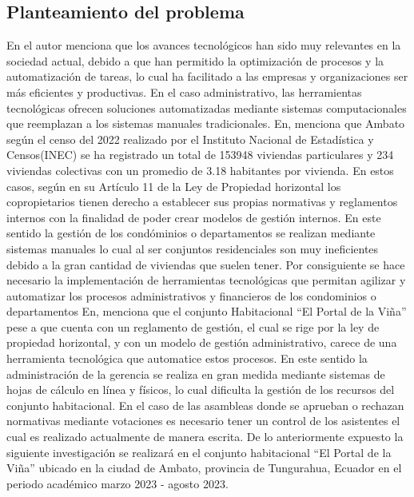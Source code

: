 \subsection{Planteamiento del problema}\label{subsec:planteamiento-del-problema}
En\cite{MoranSalazar} el autor menciona que los avances tecnológicos han sido muy relevantes en la sociedad actual, debido a que han permitido la optimización de procesos y la automatización de tareas, lo cual ha facilitado a las empresas y organizaciones ser más eficientes y productivas.
En el caso administrativo, las herramientas tecnológicas ofrecen soluciones automatizadas mediante sistemas computacionales que reemplazan a los sistemas manuales tradicionales.
\bigbreak
En\cite{INEC}, menciona que Ambato según el censo del 2022 realizado por el Instituto Nacional de Estadística y Censos(INEC) se ha registrado un total de 153948 viviendas particulares y 234 viviendas colectivas con un promedio de 3.18 habitantes por vivienda.
En estos casos, según\cite{Propiedad_Horizontal} en su Artículo 11 de la Ley de Propiedad horizontal los copropietarios tienen derecho a establecer sus propias normativas y reglamentos internos con la finalidad de poder crear modelos de gestión internos.
En este sentido la gestión de los condóminios o departamentos se realizan mediante sistemas manuales lo cual al ser conjuntos residenciales son muy ineficientes debido a la gran cantidad de viviendas que suelen tener.
Por consiguiente se hace necesario la implementación de herramientas tecnológicas que permitan agilizar y automatizar los procesos administrativos y financieros de los condominios o departamentos
\bigbreak
En\cite{FajardoFlores}, menciona que el conjunto Habitacional {\textquotedblleft}El Portal de la Viña{\textquotedblright} pese a que cuenta con un reglamento de gestión, el cual se rige por la ley de propiedad horizontal, y con un modelo de gestión administrativo, carece de una herramienta tecnológica que automatice estos procesos.
En este sentido la administración de la gerencia se realiza en gran medida mediante sistemas de hojas de cálculo en línea y físicos, lo cual dificulta la gestión de los recursos del conjunto habitacional.
En el caso de las asambleas donde se aprueban o rechazan normativas mediante votaciones es necesario tener un control de los asistentes el cual es realizado actualmente de manera escrita.
\bigbreak
De lo anteriormente expuesto la siguiente investigación se realizará en el conjunto habitacional {\textquotedblleft}El Portal de la Viña{\textquotedblright} ubicado en la ciudad de Ambato, provincia de Tungurahua, Ecuador en el periodo académico marzo 2023 - agosto 2023.